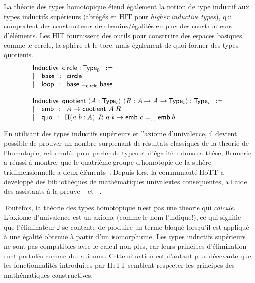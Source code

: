 La théorie des types homotopique étend également la notion de type inductif 
aux types inductifs supérieurs (abrégés en HIT pour \emph{higher inductive types}), 
qui comportent des constructeurs de chemins/égalités en plus des constructeurs d'éléments. 
% 
Les HIT fournissent des outils pour construire des espaces basiques comme le cercle, 
la sphère et le tore, mais également de quoi former des types quotients.
% 
\[
\begin{array}{l}
\mathsf{Inductive}\enskip\mathsf{circle} : \varType_0\enskip := \\
\sep \quad \mathsf{base} \enskip : \enskip \mathsf{circle}\\
\sep \quad \mathsf{loop} \enskip : \enskip \Indeq{\mathsf{circle}}{\mathsf{base}}{\mathsf{base}} \\
\\
\mathsf{Inductive}\enskip\mathsf{quotient}\ (A : \varType_i)\ (R : A \to A \to \varType_i) : \varType_i\enskip := \\
\sep \quad \mathsf{emb} \enskip : \enskip A \to \mathsf{quotient}\ A\ R \\
\sep \quad \mathsf{quo} \enskip : \enskip \Depfun[a\ b]{A}{R\ a\ b \to \Indeq{...}{\mathsf{emb}\ a}{\mathsf{emb}\ b}} \\
\end{array}
\]

En utilisant des types inductifs supérieurs et l'axiome d'univalence, il devient
possible de prouver un nombre surprenant de résultats classiques de la théorie 
de l'homotopie, reformulés pour parler de types et d'égalité~: 
% 
dans sa thèse, Brunerie a réussi à montrer que le quatrième groupe d'homotopie 
de la sphère tridimensionnelle a deux éléments~. 
% 
Depuis lors, la communauté HoTT a développé des bibliothèques de 
mathématiques univalentes conséquentes, à l'aide des assistants à la preuve
\Coq~ et \Agda~.

Toutefois, la théorie des types homotopique n'est pas une théorie qui 
\emph{calcule}. L'axiome d'univalence est un axiome (comme le nom l'indique!), 
ce qui signifie que l'éliminateur \( \mathsf{J} \) se contente de produire un 
terme bloqué lorsqu'il est appliqué à une égalité obtenue à partir d'un 
isomorphisme. 
% 
Les types inductifs supérieurs ne sont pas compatibles avec le calcul non plus, 
car leurs principes d'élimination sont postulés comme des axiomes. 
% 
Cette situation est d'autant plus décevante que les fonctionnalités introduites 
par HoTT semblent respecter les principes des mathématiques constructives.

